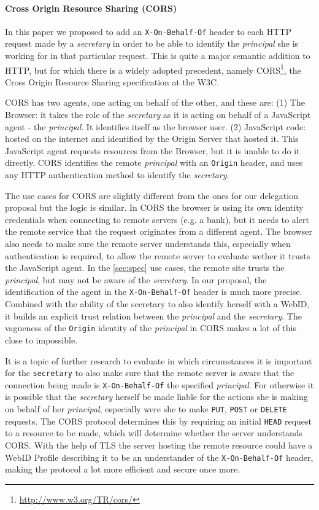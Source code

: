 \documentclass[a4paper]{llncs}
\begin{document}
\paragraph{Cross Origin Resource Sharing (CORS)}
In this paper we proposed to add an \lstinline|X-On-Behalf-Of| header to each HTTP request made by a \textit{secretary} in order to be able to identify the \textit{principal} she is working for in that particular request.
This is quite a major semantic addition to HTTP, but for which there is a widely adopted precedent, namely CORS\footnote{\url{http://www.w3.org/TR/cors/}}, the Cross Origin Resource Sharing specification at the W3C.

CORS has two agents, one acting on behalf of the other, and these are: 
(1) The Browser: it takes the role of the \textit{secretary} as it is acting on behalf of a JavaScript agent - the \textit{principal}. It identifies itself as the browser user.
(2) JavaScript code: hosted on the internet and identified by the Origin Server that hosted it.
This JavaScript agent requests resources from the Browser, but it is unable to do it directly. 
CORS identifies the remote \textit{principal} with an \lstinline|Origin| header, and uses any HTTP authentication method to identify the \textit{secretary}.

The use cases for CORS are slightly different from the ones for our delegation proposal but the logic is similar. 
In CORS the browser is using its own identity credentials when connecting to remote servers (e.g. a bank), but it needs to alert the remote service that the request originates from a different agent.
The browser also needs to make sure the remote server understands this, especially when authentication is required, to allow the remote server to evaluate wether it trusts the JavaScript agent.
In the \autoref{sec:spec} use cases, the remote site trusts the \textit{principal}, but may not be aware of the \textit{secretary}.
In our proposal, the identification of the agent in the \lstinline|X-On-Behalf-Of| header is much more precise.
Combined with the ability of the secretary to also identify herself with a WebID, it builds an explicit trust relation between the \textit{principal} and the \textit{secretary}. The vagueness of the \lstinline|Origin| identity of the \textit{principal} in CORS makes a lot of this close to impossible.

It is a topic of further research to evaluate in which circumstances it is important for the \lstinline|secretary| to also make sure that the remote server is aware that the connection being made is \lstinline|X-On-Behalf-Of| the specified \textit{principal}. 
For otherwise it is possible that the \textit{secretary} herself be made liable for the actions she is making on behalf of her \textit{principal}, especially were she to make \texttt{PUT}, \texttt{POST} or \texttt{DELETE} requests. 
The CORS protocol determines this by  requiring an initial \texttt{HEAD} request to a resource to be made, which will determine whether the server understands CORS.
With the help of TLS the server hosting the remote resource could have a WebID Profile describing it to be an understander of the \lstinline|X-On-Behalf-Of| header, making the protocol a lot more efficient and secure once more.
\end{document}
